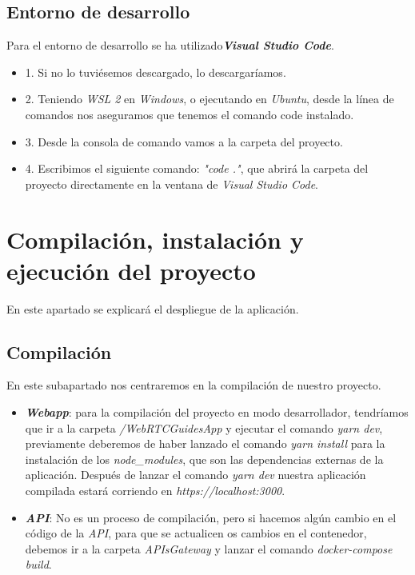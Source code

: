 \subsection{Entorno de desarrollo}
Para el entorno de desarrollo se ha utilizado\textit{\textbf{Visual Studio Code}}.
\begin{itemize}
    \item 1. Si no lo tuviésemos descargado, lo descargaríamos.
    \item 2. Teniendo \textit{WSL 2} en \textit{Windows}, o ejecutando en \textit{Ubuntu}, desde la línea de comandos nos aseguramos que tenemos el comando code instalado.
    \item 3. Desde la consola de comando vamos a la carpeta del proyecto.
    \item 4. Escribimos el siguiente comando: \textit{"code ."}, que abrirá la carpeta del proyecto directamente en la ventana de \textit{Visual Studio Code}.

\end{itemize}
\section{Compilación, instalación y ejecución del proyecto}
En este apartado se explicará el despliegue de la aplicación.
\subsection{Compilación}
En este subapartado nos centraremos en la compilación de nuestro proyecto.
\begin{itemize}
    \item \textit{\textbf{Webapp}}: para la compilación del proyecto en modo desarrollador, tendríamos que ir a la carpeta \textit{/WebRTCGuidesApp} y ejecutar el comando \textit{yarn dev}, previamente deberemos de haber lanzado el comando \textit{yarn install} para la instalación de los \textit{node\_modules}, que son las dependencias externas de la aplicación. Después de lanzar el comando \textit{yarn dev} nuestra aplicación compilada estará corriendo en \textit{https://localhost:3000}.
    \item \textit{\textbf{API}}: No es un proceso de compilación, pero si hacemos algún cambio en el código de la \textit{API}, para que se actualicen os cambios en el contenedor, debemos ir a la carpeta \textit{APIsGateway} y lanzar el comando \textit{docker-compose build}.
\end{itemize}
